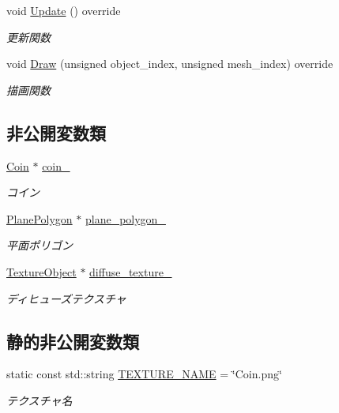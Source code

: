 \begin{DoxyCompactItemize}
void \mbox{\hyperlink{class_coin_draw_a6157b17bf1706b85156aad0d88acfd7e}{Update}} () override
\begin{DoxyCompactList}\small\item\em 更新関数 \end{DoxyCompactList}\item 
void \mbox{\hyperlink{class_coin_draw_ac7d91fecb6845cebe276eb81a4953563}{Draw}} (unsigned object\+\_\+index, unsigned mesh\+\_\+index) override
\begin{DoxyCompactList}\small\item\em 描画関数 \end{DoxyCompactList}\end{DoxyCompactItemize}
\subsection*{非公開変数類}
\begin{DoxyCompactItemize}
\item 
\mbox{\hyperlink{class_coin}{Coin}} $\ast$ \mbox{\hyperlink{class_coin_draw_a62baab6b1a22df45ce4c81970f4a38f4}{coin\+\_\+}}
\begin{DoxyCompactList}\small\item\em コイン \end{DoxyCompactList}\item 
\mbox{\hyperlink{class_plane_polygon}{Plane\+Polygon}} $\ast$ \mbox{\hyperlink{class_coin_draw_a477ea90c9f9069784e701fa5787700d1}{plane\+\_\+polygon\+\_\+}}
\begin{DoxyCompactList}\small\item\em 平面ポリゴン \end{DoxyCompactList}\item 
\mbox{\hyperlink{class_texture_object}{Texture\+Object}} $\ast$ \mbox{\hyperlink{class_coin_draw_a3276c57dc391b0355fb1575e7399afe5}{diffuse\+\_\+texture\+\_\+}}
\begin{DoxyCompactList}\small\item\em ディヒューズテクスチャ \end{DoxyCompactList}\end{DoxyCompactItemize}
\subsection*{静的非公開変数類}
\begin{DoxyCompactItemize}
\item 
static const std\+::string \mbox{\hyperlink{class_coin_draw_a8d71d4b62d26aa6fa346a42cad05c805}{T\+E\+X\+T\+U\+R\+E\+\_\+\+N\+A\+ME}} = \char`\"{}Coin.\+png\char`\"{}
\begin{DoxyCompactList}\small\item\em テクスチャ名 \end{DoxyCompactList}\end{DoxyCompactItemize}


